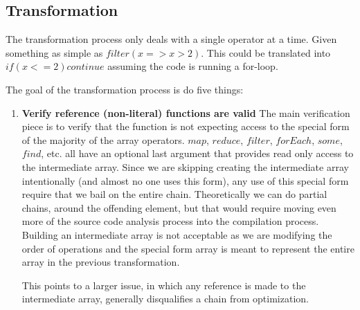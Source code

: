 \subsection{Transformation}

The transformation process only deals with a single operator at a time.  Given something as simple as $filter(x => x > 2)$.  This could be translated into $if (x <= 2) continue$ assuming the code is running a for-loop.

The goal of the transformation process is do five things:
\begin{enumerate}
  \item \textbf{Verify reference (non-literal) functions are valid}
    The main verification piece is to verify that the function is not expecting access to the special
    form of the majority of the array operators.  $map$, $reduce$, $filter$, $forEach$, $some$, $find$, etc.  all have an optional last argument that provides read only access to the intermediate array.  Since we are skipping creating the intermediate array intentionally (and almost no one uses this form), any use of this special form require that we bail on the entire chain. Theoretically we can do partial chains, around the offending element, but that would require moving even more of the source code analysis process into the compilation process.  Building an intermediate array is not acceptable  as we are modifying the order of operations and the special form array is meant to represent the entire array in the previous transformation.

    This points to a larger issue, in which any reference is made to the intermediate array, generally disqualifies a chain from optimization.
  

\end{enumerate}
